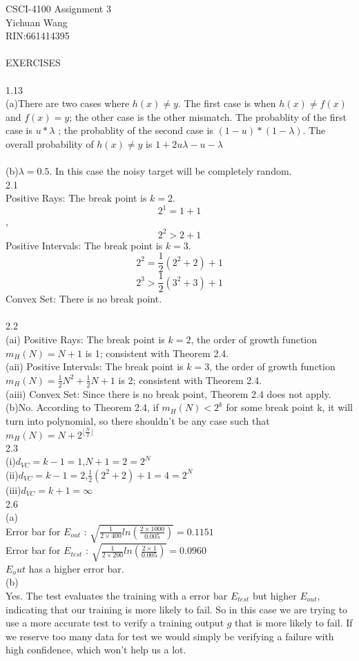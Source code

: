 \documentclass[12pt]{article}
\begin{document}
CSCI-4100 Assignment 3\\
Yichuan Wang \\
RIN:661414395\\\\

EXERCISES\\\\
1.13\\
(a)There are two cases where $h(x) \neq y$. The first case is when $h(x) \neq f(x)$ and $f(x)=y$; the other case is the other mismatch. The probablity of the first case is $u*\lambda$ ; the probablity of the second case is $(1-u)*(1-\lambda )$. The overall probability of $h(x)\neq y$ is  $1+2u\lambda-u-\lambda$\\\\
(b)$\lambda=0.5$. In this case the noisy target will be completely random.\\

2.1\\
Positive Rays:
The break point is $k=2$. $$2^1=1+1$$, $$2^2>2+1$$
Positive Intervals:
The break point is $k=3$.
$$2^2=\frac{1}{2}(2^2+2)+1$$ $$2^3>\frac{1}{2}(3^2+3)+1$$
Convex Set: There is no break point.\\\\
2.2\\
(ai) Positive Rays: The break point is $k=2$, the order of growth function $m_H(N)=N+1$ is 1; consistent with Theorem 2.4.\\
(aii) Positive Intervals: The break point is $k=3$, the order of growth function $m_H(N)=\frac{1}{2}N^2+\frac{1}{2}N+1$ is 2; consistent with Theorem 2.4.\\
(aiii) Convex Set: Since there is no break point, Theorem 2.4 does not apply. \\
(b)No. According to Theorem 2.4, if $m_H(N)<2^k$ for some break point k, it will turn into polynomial, so there shouldn't be any case such that  $m_H(N)=N+2^{\lfloor\frac{N}{2}\rfloor}$\\
2.3\\
(i)$d_{VC}=k-1=1$,$N+1=2=2^N$\\
(ii)$d_{VC}=k-1=2$,$\frac{1}{2}(2^2+2)+1=4=2^N$\\
(iii)$d_{VC}=k+1=\infty$\\

2.6\\
(a)\\
Error bar for $E_{out}$ : $\sqrt{\frac{1}{2\times400}ln(\frac{2\times1000}{0.005})}=0.1151$\\
Error bar for $E_{test}$ : $\sqrt{\frac{1}{2\times200}ln(\frac{2\times1}{0.005})}=0.0960$\\
$E_out$ has a higher error bar.\\
(b)\\
Yes. The test evaluates the training with a error bar $E_{test}$ but higher $E_{out}$, indicating that our training is more likely to fail. So in this case we are trying to use a more accurate test to verify a training output $g$ that is more likely to fail. If we reserve too many data for test we would simply be verifying a failure with high confidence, which won't help us a lot. \\
\end{document}
